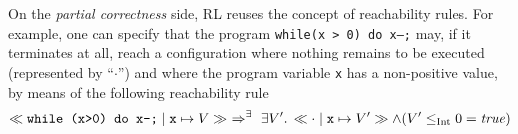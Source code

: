 

On the \emph{partial correctness} side, RL reuses the concept of reachability rules.
For example, one can specify that the program \texttt{while(x > 0) do x--;}
may, if it terminates at all, reach a configuration
where nothing remains to be executed (represented by ``$\cdot$'') and where the program variable \texttt{x} has a non-positive value,
by means of the following reachability rule
\begin{equation*}
  \ll\texttt{while (x>0) do x--;}\mid \mathtt{x}\mapsto V\gg
  \ \Rightarrow^\exists\  \exists V^\prime.\, \ll\texttt{$\cdot$}\mid \mathtt{x}\mapsto V'\gg \land (V^\prime \leq_\text{Int} 0 = \mathit{true})
  \end{equation*}
  
